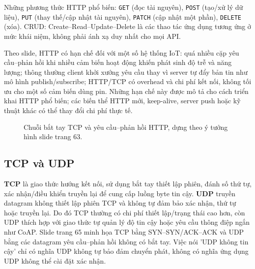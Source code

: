 Những phương thức HTTP phổ biến: \texttt{GET} (đọc tài nguyên), \texttt{POST} (tạo/xử lý dữ liệu), \texttt{PUT} (thay thế/cập nhật tài nguyên), \texttt{PATCH} (cập nhật một phần), \texttt{DELETE} (xóa). CRUD: Create--Read--Update--Delete là các thao tác ứng dụng tương ứng ở mức khái niệm, không phải ánh xạ duy nhất cho mọi API. 

Theo slide, HTTP có hạn chế đối với một số hệ thống IoT: quá nhiều cặp yêu cầu--phản hồi khi nhiều cảm biến hoạt động khiến phát sinh độ trễ và năng lượng; thông thường client khởi xướng yêu cầu thay vì server tự đẩy bản tin như mô hình publish/subscribe; HTTP/TCP có overhead và chi phí kết nối, không tối ưu cho một số cảm biến dùng pin. Những hạn chế này được mô tả cho cách triển khai HTTP phổ biến; các biến thể HTTP mới, keep-alive, server push hoặc kỹ thuật khác có thể thay đổi chi phí thực tế. 

\begin{figure}[htbp]\centering
{}
\caption{Chuỗi bắt tay TCP và yêu cầu--phản hồi HTTP, dựng theo ý tưởng hình slide trang 63.}\end{figure}

\subsection{TCP và UDP}
\textbf{TCP} là giao thức hướng kết nối, sử dụng bắt tay thiết lập phiên, đánh số thứ tự, xác nhận/điều khiển truyền lại để cung cấp luồng byte tin cậy. \textbf{UDP} truyền datagram không thiết lập phiên TCP và không tự đảm bảo xác nhận, thứ tự hoặc truyền lại. Do đó TCP thường có chi phí thiết lập/trạng thái cao hơn, còn UDP thích hợp với giao thức tự quản lý độ tin cậy hoặc yêu cầu thông điệp ngắn như CoAP. Slide trang 65 minh họa TCP bằng SYN--SYN/ACK--ACK và UDP bằng các datagram yêu cầu--phản hồi không có bắt tay. Việc nói 'UDP không tin cậy' chỉ có nghĩa UDP không tự bảo đảm chuyển phát, không có nghĩa ứng dụng UDP không thể cài đặt xác nhận. 

